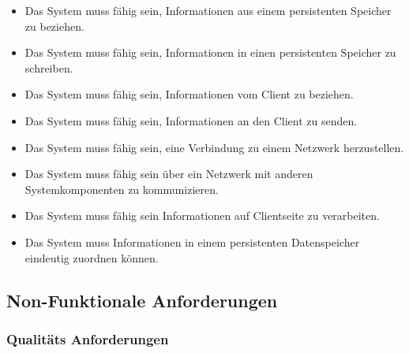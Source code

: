 \begin{itemize}
	\item Das System muss fähig sein, Informationen aus einem persistenten Speicher zu beziehen.
	\item Das System muss fähig sein, Informationen in einen persistenten Speicher zu schreiben.
	\item Das System muss fähig sein, Informationen vom Client zu beziehen.
	\item Das System muss fähig sein, Informationen an den Client zu senden.
	\item Das System muss fähig sein, eine Verbindung zu einem Netzwerk herzustellen.
	\item Das System muss fähig sein über ein Netzwerk mit anderen Systemkomponenten zu kommunizieren.
	\item Das System muss fähig sein Informationen auf Clientseite zu verarbeiten. 
	\item Das System muss Informationen in einem persistenten Datenspeicher eindeutig zuordnen können.
\end{itemize}


\subsection{Non-Funktionale Anforderungen}
\label{sec:Non-Funktionale_Anforderungen}

\subsubsection{Qualitäts Anforderungen}
\label{sec:Qualitäts_Anforderungen}

